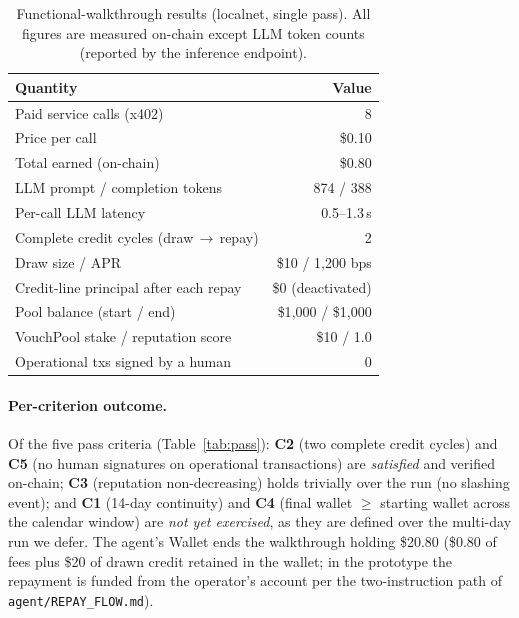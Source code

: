 \documentclass[10pt,conference,letterpaper]{IEEEtran}
\theoremstyle{definition}
\begin{document}
\begin{table}[t]
\caption{Functional-walkthrough results (localnet, single pass). All figures
are measured on-chain except LLM token counts (reported by the inference
endpoint).}
\label{tab:walkthrough}
\centering
\small
\begin{tabularx}{\columnwidth}{Xr}
\toprule
\textbf{Quantity} & \textbf{Value} \\
\midrule
Paid service calls (x402)            & 8 \\
Price per call                       & \$0.10 \\
Total earned (on-chain)              & \$0.80 \\
LLM prompt / completion tokens       & 874 / 388 \\
Per-call LLM latency                 & 0.5--1.3\,s \\
Complete credit cycles (draw\,$\to$\,repay) & 2 \\
Draw size / APR                      & \$10 / 1{,}200 bps \\
Credit-line principal after each repay & \$0 (deactivated) \\
Pool balance (start / end)           & \$1{,}000 / \$1{,}000 \\
VouchPool stake / reputation score   & \$10 / 1.0 \\
Operational txs signed by a human    & 0 \\
\bottomrule
\end{tabularx}
\end{table}

\paragraph{Per-criterion outcome.} Of the five pass criteria
(Table~\ref{tab:pass}): \textbf{C2} (two complete credit cycles) and
\textbf{C5} (no human signatures on operational transactions) are
\emph{satisfied} and verified on-chain; \textbf{C3} (reputation
non-decreasing) holds trivially over the run (no slashing event); and
\textbf{C1} (14-day continuity) and \textbf{C4} (final wallet
$\ge$ starting wallet across the calendar window) are \emph{not yet
exercised}, as they are defined over the multi-day run we defer. The agent's
Wallet ends the walkthrough holding \$20.80 (\$0.80 of fees plus \$20 of
drawn credit retained in the wallet; in the prototype the repayment is funded
from the operator's account per the two-instruction path of
\texttt{agent/REPAY\_FLOW.md}).
\end{document}
